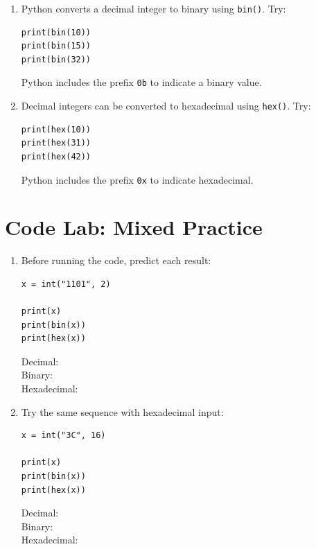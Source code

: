 \documentclass{article}
\begin{document}
\begin{enumerate}

\item Python converts a decimal integer to binary using \texttt{bin()}. Try:

\begin{verbatim}
print(bin(10))
print(bin(15))
print(bin(32))
\end{verbatim}

Python includes the prefix \texttt{0b} to indicate a binary value.

\item Decimal integers can be converted to hexadecimal using \texttt{hex()}.  Try:

\begin{verbatim}
print(hex(10))
print(hex(31))
print(hex(42))
\end{verbatim}

Python includes the prefix \texttt{0x} to indicate hexadecimal.

\end{enumerate}


\section{Code Lab: Mixed Practice}

\begin{enumerate}

\item Before running the code, predict each result:

\begin{verbatim}
x = int("1101", 2)

print(x)
print(bin(x))
print(hex(x))
\end{verbatim}

Decimal: \\ 
Binary: \\ 
Hexadecimal: \\ 

\item Try the same sequence with hexadecimal input:

\begin{verbatim}
x = int("3C", 16)

print(x)
print(bin(x))
print(hex(x))
\end{verbatim}

Decimal: \\ 
Binary: \\ 
Hexadecimal: \\ 

\end{enumerate}
\end{document}
